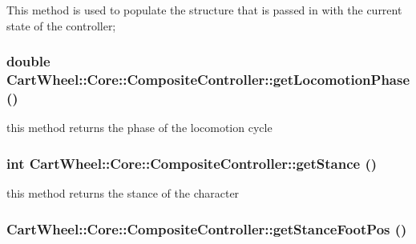 \label{classCartWheel_1_1Core_1_1CompositeController_a219265eeea3ee500a306dbd2b871f59c}
This method is used to populate the structure that is passed in with the current state of the controller; \hypertarget{classCartWheel_1_1Core_1_1CompositeController_a679090602ea27f39dc59f03cf7565fb0}{
\subsubsection[{getLocomotionPhase}]{\setlength{\rightskip}{0pt plus 5cm}double CartWheel::Core::CompositeController::getLocomotionPhase ()}}
\label{classCartWheel_1_1Core_1_1CompositeController_a679090602ea27f39dc59f03cf7565fb0}
this method returns the phase of the locomotion cycle \hypertarget{classCartWheel_1_1Core_1_1CompositeController_aeb22cf259010719d7e0c42e91dd725c7}{
\subsubsection[{getStance}]{\setlength{\rightskip}{0pt plus 5cm}int CartWheel::Core::CompositeController::getStance ()}}
\label{classCartWheel_1_1Core_1_1CompositeController_aeb22cf259010719d7e0c42e91dd725c7}
this method returns the stance of the character \hypertarget{classCartWheel_1_1Core_1_1CompositeController_ac9116608597803a4adf905f78670f621}{
\subsubsection[{getStanceFootPos}]{ CartWheel::Core::CompositeController::getStanceFootPos ()}}
